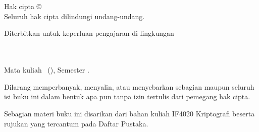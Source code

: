 \documentclass[../main.tex]{subfiles}
\begin{document}
\thispagestyle{empty}
\begingroup
\vspace*{\fill}
{\small
\textbf{\BookTitle}\\
\BookSubtitle\\
\BookEdition
\par\vspace{0.5cm}

Hak cipta \copyright\ \BookYear\ \BookAuthor\\
Seluruh hak cipta dilindungi undang-undang.
\par\vspace{0.5cm}

Diterbitkan untuk keperluan pengajaran di lingkungan\\
\BookProgram\\
\BookFaculty\\
\BookInstitution
\par\vspace{0.5cm}

Mata kuliah \BookTitle\ (\BookCourseCode), Semester \BookSemester.
\par\vspace{0.5cm}

Dilarang memperbanyak, menyalin, atau menyebarkan sebagian maupun seluruh isi
buku ini dalam bentuk apa pun tanpa izin tertulis dari pemegang hak cipta.
\par\vspace{0.5cm}

Sebagian materi buku ini disarikan dari bahan kuliah IF4020 Kriptografi beserta
rujukan yang tercantum pada Daftar Pustaka.
\par}
\vspace*{\fill}
\endgroup
\clearpage
\end{document}
